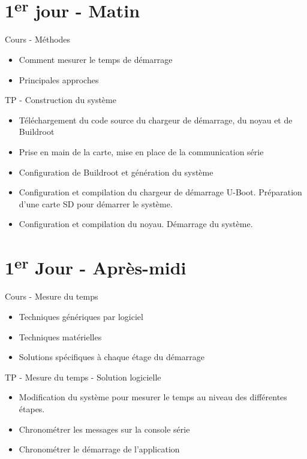 \documentclass[a4paper,12pt,obeyspaces,spaces,hyphens]{article}
\begin{document}
\section{1\textsuperscript{er} jour - Matin}

\feagendatwocolumn
{Cours - Méthodes}
{
  \begin{itemize}
  \item Comment mesurer le temps de démarrage
  \item Principales approches
  \end{itemize}
}
{TP - Construction du système}
{
 \begin{itemize}
 \item Téléchargement du code source du chargeur de démarrage, du noyau et de Buildroot
 \item Prise en main de la carte, mise en place de la communication série
 \item Configuration de Buildroot et génération du système
 \item Configuration et compilation du chargeur de démarrage U-Boot. Préparation d'une
       carte SD pour démarrer le système.
 \item Configuration et compilation du noyau. Démarrage du système.
 \end{itemize}
}

\section{1\textsuperscript{er} Jour - Après-midi}

\feagendatwocolumn
{Cours - Mesure du temps}
{
  \begin{itemize}
  \item Techniques génériques par logiciel
  \item Techniques matérielles
  \item Solutions spécifiques à chaque étage du démarrage
  \end{itemize}
}
{TP - Mesure du temps - Solution logicielle}
{
 \begin{itemize}
 \item Modification du système pour mesurer le temps au niveau des différentes étapes.
 \item Chronométrer les messages sur la console série
 \item Chronométrer le démarrage de l'application
 \end{itemize}
}
\end{document}
